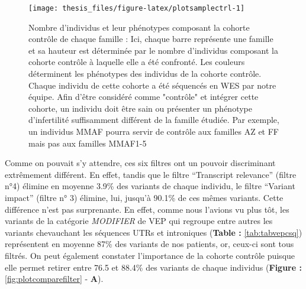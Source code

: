 \documentclass[12pt,twoside]{reedthesis}
\theoremstyle{definition}
\theoremstyle{definition}
\theoremstyle{remark}
\begin{document}
  \begin{figure}
  
  {\centering \texttt{[image: thesis\_files/figure-latex/plotsamplectrl-1]} 
  
  }
  
  \caption[Nombre d'individus et leur phénotypes composant la cohorte contrôle de chaque famille]{Nombre d'individus et leur phénotypes composant la cohorte contrôle de chaque famille : Ici, chaque barre représente une famille et sa hauteur est déterminée par le nombre d'individus composant la cohorte contrôle à laquelle elle a été confronté. Les couleurs déterminent les phénotypes des individus de la cohorte contrôle. Chaque individu de cette cohorte a été séquencés en WES par notre équipe. Afin d'être considéré comme "contrôle" et intégrer cette cohorte, un individu doit être sain ou présenter un phénotype d'infertilité suffisamment différent de la famille étudiée. Par exemple, un individus MMAF pourra servir de contrôle aux familles AZ et FF mais pas aux familles MMAF1-5}\label{fig:plotsamplectrl}
  \end{figure}
  
  \newpage
  
  Comme on pouvait s'y attendre, ces six filtres ont un pouvoir
  discriminant extrêmement différent. En effet, tandis que le filtre
  ``Transcript relevance'' (filtre n°4) élimine en moyenne 3.9\% des
  variants de chaque individu, le filtre ``Variant impact'' (filtre n° 3)
  élimine, lui, jusqu'à 90.1\% de ces mêmes variants. Cette différence
  n'est pas surprenante. En effet, comme nous l'avions vu plus tôt, les
  variants de la catégorie \emph{MODIFIER} de VEP qui regroupe entre
  autres les variants chevauchant les séquences UTRs et introniques
  (\textbf{Table :} \ref{tab:tabvepcsq}) représentent en moyenne 87\% des
  variants de nos patients, or, ceux-ci sont tous filtrés. On peut
  également constater l'importance de la cohorte contrôle puisque elle
  permet retirer entre 76.5 et 88.4\% des variants de chaque individus
  (\textbf{Figure :} \ref{fig:plotcomparefilter} - \textbf{A}).
  
\end{document}
